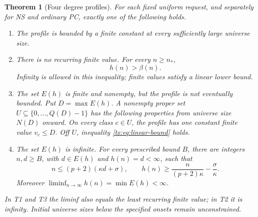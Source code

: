 \documentclass[11pt,a4paper,oneside,openany]{book}
\newtheorem{theorem}{Theorem}[chapter]
\theoremstyle{definition}\newtheorem{definition}[theorem]{Definition}
\theoremstyle{remark}\newtheorem{remark}[theorem]{Remark}
\numberwithin{equation}{chapter}
\begin{document}
\begin{theorem}[Four degree profiles]\label{tx:thm:profiles}\label{tx:thm:classification}
For each fixed uniform request, and separately for NS and ordinary PC,
exactly one of the following holds.
\begin{enumerate}[label=\textup{T\arabic*.}]
\item The profile is bounded by a finite constant at every sufficiently
large universe size.
\item There is no recurring finite value. For every $n\ge n_*$,
\begin{equation}\label{tx:eq:linear-bound}
                                  h(n)>\beta(n).
\end{equation}
Infinity is allowed in this inequality; finite values satisfy a linear
lower bound.
\item The set $E(h)$ is finite and nonempty, but the profile is not
eventually bounded. Put $D=\max E(h)$. A nonempty proper set
$U\subseteq\{0,\ldots,Q(D)-1\}$ has the following properties from
universe size $N(D)$ onward. On every class $c\in U$, the profile has one
constant finite value $v_c\le D$. Off $U$, inequality
\eqref{tx:eq:linear-bound} holds.
\item The set $E(h)$ is infinite. For every prescribed bound $B$, there
are integers $n,d\ge B$, with $d\in E(h)$ and $h(n)=d<\infty$, such that
\begin{equation}\label{tx:eq:finite-peaks}
 n\le(p+2)(\kappa d+\sigma),\qquad
 h(n)\ge\frac{n}{(p+2)\kappa}-\frac{\sigma}{\kappa}.
\end{equation}
Moreover $\liminf_{n\to\infty}h(n)=\min E(h)<\infty$.
\end{enumerate}
In T1 and T3 the liminf also equals the least recurring finite value;
in T2 it is infinity. Initial universe sizes below the specified onsets remain
unconstrained.
\end{theorem}
\end{document}
